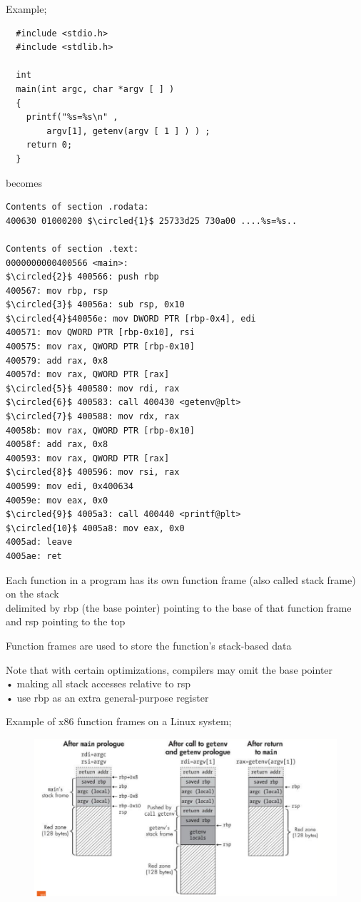 \documentclass[]{project_plan}
\newcommand*\circled[1]{\tikz[baseline=(char.base)]{
            \node[shape=circle,draw,inner sep=2pt] (char) {#1};}}
\begin{document}
Example;
\begin{lstlisting}
  #include <stdio.h>
  #include <stdlib.h>

  int
  main(int argc, char *argv [ ] )
  {
    printf("%s=%s\n" ,
        argv[1], getenv(argv [ 1 ] ) ) ;
    return 0;
  }
\end{lstlisting}
becomes
\begin{lstlisting}[mathescape]
  Contents of section .rodata:
400630 01000200 $\circled{1}$ 25733d25 730a00 ....%s=%s..

Contents of section .text:
0000000000400566 <main>:
$\circled{2}$ 400566: push rbp
400567: mov rbp, rsp
$\circled{3}$ 40056a: sub rsp, 0x10
$\circled{4}$40056e: mov DWORD PTR [rbp-0x4], edi
400571: mov QWORD PTR [rbp-0x10], rsi
400575: mov rax, QWORD PTR [rbp-0x10]
400579: add rax, 0x8
40057d: mov rax, QWORD PTR [rax]
$\circled{5}$ 400580: mov rdi, rax
$\circled{6}$ 400583: call 400430 <getenv@plt>
$\circled{7}$ 400588: mov rdx, rax
40058b: mov rax, QWORD PTR [rbp-0x10]
40058f: add rax, 0x8
400593: mov rax, QWORD PTR [rax]
$\circled{8}$ 400596: mov rsi, rax
400599: mov edi, 0x400634
40059e: mov eax, 0x0
$\circled{9}$ 4005a3: call 400440 <printf@plt>
$\circled{10}$ 4005a8: mov eax, 0x0
4005ad: leave
4005ae: ret
\end{lstlisting}

Each function in a program has its own function frame (also called stack frame) on the stack\\
delimited by rbp (the base pointer) pointing to the base of that function frame and rsp pointing to the top

Function frames are used to store the function’s stack-based data

Note that with certain optimizations, compilers may omit the base pointer\\
• making all stack accesses relative to rsp\\
• use rbp as an extra general-purpose register

Example of x86 function frames on a Linux system;
\begin{figure}[H]
  \centering
  \includegraphics[width=.8\linewidth]{function_frames_linux_system.png}
\end{figure}
\end{document}
